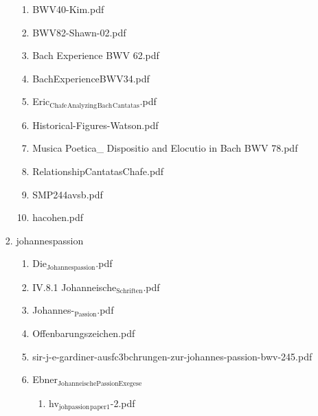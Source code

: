 \documentclass[11pt]{article}
\begin{document}
\begin{enumerate}
\begin{enumerate}
\begin{enumerate}
\begin{enumerate}
\item BWV40-Kim.pdf
\label{sec-1-1-1-1-31-7-2-10-5-2}

\item BWV82-Shawn-02.pdf
\label{sec-1-1-1-1-31-7-2-10-5-3}

\item Bach Experience BWV 62.pdf
\label{sec-1-1-1-1-31-7-2-10-5-4}

\item BachExperienceBWV34.pdf
\label{sec-1-1-1-1-31-7-2-10-5-5}

\item Eric$_{\text{Chafe}}$$_{\text{Analyzing}}$$_{\text{Bach}}$$_{\text{Cantatas}}$.pdf
\label{sec-1-1-1-1-31-7-2-10-5-6}

\item Historical-Figures-Watson.pdf
\label{sec-1-1-1-1-31-7-2-10-5-7}

\item Musica Poetica\_ Dispositio and Elocutio in Bach BWV 78.pdf
\label{sec-1-1-1-1-31-7-2-10-5-8}

\item RelationshipCantatasChafe.pdf
\label{sec-1-1-1-1-31-7-2-10-5-9}

\item SMP244avsb.pdf
\label{sec-1-1-1-1-31-7-2-10-5-10}

\item hacohen.pdf
\label{sec-1-1-1-1-31-7-2-10-5-11}
\end{enumerate}

\item johannespassion
\label{sec-1-1-1-1-31-7-2-10-6}
\begin{enumerate}
\item Die$_{\text{Johannespassion}}$.pdf
\label{sec-1-1-1-1-31-7-2-10-6-1}

\item IV.8.1 Johanneische$_{\text{Schriften}}$.pdf
\label{sec-1-1-1-1-31-7-2-10-6-2}

\item Johannes-$_{\text{Passion}}$.pdf
\label{sec-1-1-1-1-31-7-2-10-6-3}

\item Offenbarungszeichen.pdf
\label{sec-1-1-1-1-31-7-2-10-6-4}

\item sir-j-e-gardiner-ausfc3bchrungen-zur-johannes-passion-bwv-245.pdf
\label{sec-1-1-1-1-31-7-2-10-6-5}

\item Ebner$_{\text{JohanneischePassionExegese}}$
\label{sec-1-1-1-1-31-7-2-10-6-6}
\begin{enumerate}
\item hv$_{\text{johpassion}}$$_{\text{paper1}}$-2.pdf
\label{sec-1-1-1-1-31-7-2-10-6-6-1}


\end{enumerate}
\end{enumerate}
\end{enumerate}
\end{enumerate}
\end{enumerate}
\end{document}
